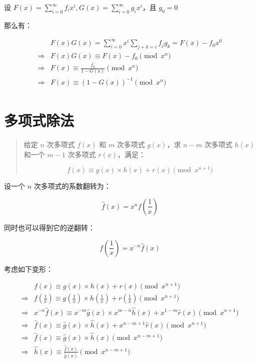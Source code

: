 \documentclass[UTF8]{article}
\begin{document}
设 $F(x)=\sum_{i=0}^{\infty}f_ix^i,G(x)=\sum_{i=0}^{\infty}g_ix^i$，且 $g_0=0$

那么有：

$$
\begin{aligned}
& F(x)G(x)=\sum_{i=0}^{\infty}x^i\sum_{j+k=i}f_jg_k=F(x)-f_0x^0 \\
\Rightarrow & F(x)G(x) \equiv F(x)-f_0 \pmod {x^n} \\
\Rightarrow & F(x) \equiv \frac{f_0}{1-G(x)} \pmod {x^n} \\
\Rightarrow & F(x) \equiv (1-G(x))^{-1} \pmod {x^n} \\
\end{aligned}
$$

\section{多项式除法}

\begin{quotation}
    给定 $n$ 次多项式 $f(x)$ 和 $m$ 次多项式 $g(x)$，求 $n-m$ 次多项式 $h(x)$ 和一个 $m-1$ 次多项式 $r(x)$，满足：

    $$
    f(x) \equiv g(x) \times h(x)+r(x) \pmod {x^{n+1}}
    $$
\end{quotation}

设一个 $n$ 次多项式的系数翻转为：

$$
\hat f(x)=x^nf(\frac{1}{x})
$$

同时也可以得到它的逆翻转：

$$
f(\frac{1}{x})=x^{-n}\hat f(x)
$$

考虑如下变形：

$$
\begin{aligned}
&f(x) \equiv g(x) \times h(x)+r(x) \pmod {x^{n+1}} \\
\Rightarrow 
& f(\frac{1}{x}) \equiv g(\frac{1}{x}) \times h(\frac{1}{x})+r(\frac{1}{x}) \pmod {x^{n+1}} \\
\Rightarrow 
& x^{-n}\hat f(x) \equiv x^{-m} \hat g(x) \times x^{m-n}\hat h(x)+x^{1-m}\hat r(x) \pmod {x^{n+1}} \\
\Rightarrow 
& \hat f(x) \equiv \hat g(x) \times \hat h(x)+x^{n-m+1}\hat r(x) \pmod {x^{n+1}} \\
\Rightarrow 
& \hat f(x) \equiv \hat g(x) \times \hat h(x) \pmod {x^{n-m+1}} \\
\Rightarrow 
& \hat h(x) \equiv \frac{\hat f(x)}{\hat g(x)} \pmod {x^{n-m+1}} \\
\end{aligned}
$$
\end{document}
